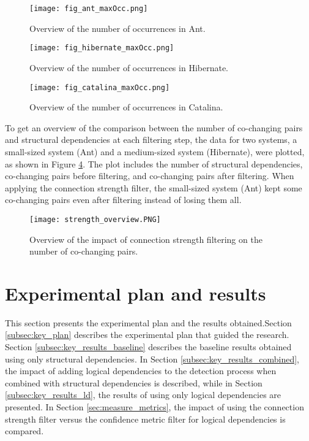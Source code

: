\begin{figure}[H]
\centering
\texttt{[image: fig\_ant\_maxOcc.png]}
\caption{Overview of the number of occurrences in Ant. }
\label{fig:strength_overview_ant}
\centering
\end{figure}

\begin{figure}[H]
\centering
\texttt{[image: fig\_hibernate\_maxOcc.png]}
\caption{Overview of the number of occurrences in Hibernate. }
\label{fig:strength_overview_hibernate}
\centering
\end{figure}


\begin{figure}[H]
\centering
\texttt{[image: fig\_catalina\_maxOcc.png]}
\caption{Overview of the number of occurrences in Catalina. }
\label{fig:strength_overview_catalina}
\centering
\end{figure}

To get an overview of the comparison between the number of co-changing pairs and structural dependencies at each filtering step, the data for two systems, a small-sized system (Ant) and a medium-sized system (Hibernate), were plotted, as shown in Figure \ref{fig:strength_overview}. The plot includes the number of structural dependencies, co-changing pairs before filtering, and co-changing pairs after filtering. When applying the connection strength filter, the small-sized system (Ant) kept some co-changing pairs even after filtering instead of losing them all.

\begin{figure}[H]
\centering
\texttt{[image: strength\_overview.PNG]}
\caption{Overview of the impact of connection strength filtering on the number of co-changing pairs. }
\label{fig:strength_overview}
\centering
\end{figure}

\section{Experimental plan and results}
\label{sec:key_plan_and_results}

\hspace{4em}This section presents the experimental plan and the results obtained.Section \ref{subsec:key_plan} describes the experimental plan that guided the research. Section \ref{subsec:key_results_baseline} describes the baseline results obtained using only structural dependencies. In Section \ref{subsec:key_results_combined}, the impact of adding logical dependencies to the detection process when combined with structural dependencies is described, while in Section \ref{subsec:key_results_ld}, the results of using only logical dependencies are presented. In Section \ref{sec:measure_metrics}, the impact of using the connection strength filter versus the confidence metric filter for logical dependencies is compared.


